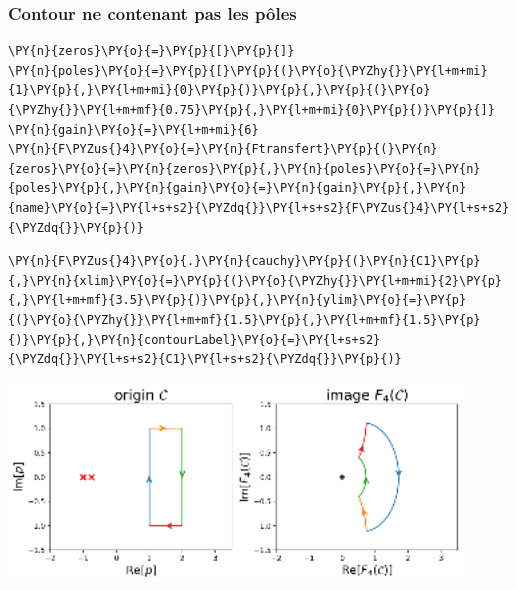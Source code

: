\subsubsection{Contour ne contenant pas les pôles}
\begin{tcolorbox}[breakable, size=fbox, boxrule=1pt, pad at break*=1mm,colback=cellbackground, colframe=cellborder]
\begin{Verbatim}[commandchars=\\\{\}]
\PY{n}{zeros}\PY{o}{=}\PY{p}{[}\PY{p}{]}
\PY{n}{poles}\PY{o}{=}\PY{p}{[}\PY{p}{(}\PY{o}{\PYZhy{}}\PY{l+m+mi}{1}\PY{p}{,}\PY{l+m+mi}{0}\PY{p}{)}\PY{p}{,}\PY{p}{(}\PY{o}{\PYZhy{}}\PY{l+m+mf}{0.75}\PY{p}{,}\PY{l+m+mi}{0}\PY{p}{)}\PY{p}{]}
\PY{n}{gain}\PY{o}{=}\PY{l+m+mi}{6}
\PY{n}{F\PYZus{}4}\PY{o}{=}\PY{n}{Ftransfert}\PY{p}{(}\PY{n}{zeros}\PY{o}{=}\PY{n}{zeros}\PY{p}{,}\PY{n}{poles}\PY{o}{=}\PY{n}{poles}\PY{p}{,}\PY{n}{gain}\PY{o}{=}\PY{n}{gain}\PY{p}{,}\PY{n}{name}\PY{o}{=}\PY{l+s+s2}{\PYZdq{}}\PY{l+s+s2}{F\PYZus{}4}\PY{l+s+s2}{\PYZdq{}}\PY{p}{)}
\end{Verbatim}
\end{tcolorbox}
\begin{tcolorbox}[breakable, size=fbox, boxrule=1pt, pad at break*=1mm,colback=cellbackground, colframe=cellborder]
\begin{Verbatim}[commandchars=\\\{\}]
\PY{n}{F\PYZus{}4}\PY{o}{.}\PY{n}{cauchy}\PY{p}{(}\PY{n}{C1}\PY{p}{,}\PY{n}{xlim}\PY{o}{=}\PY{p}{(}\PY{o}{\PYZhy{}}\PY{l+m+mi}{2}\PY{p}{,}\PY{l+m+mf}{3.5}\PY{p}{)}\PY{p}{,}\PY{n}{ylim}\PY{o}{=}\PY{p}{(}\PY{o}{\PYZhy{}}\PY{l+m+mf}{1.5}\PY{p}{,}\PY{l+m+mf}{1.5}\PY{p}{)}\PY{p}{,}\PY{n}{contourLabel}\PY{o}{=}\PY{l+s+s2}{\PYZdq{}}\PY{l+s+s2}{C1}\PY{l+s+s2}{\PYZdq{}}\PY{p}{)}
\end{Verbatim}
\end{tcolorbox}
\begin{center}
    \includegraphics[width=0.9\textwidth]{notebook/fig/output_39_1.eps}
\end{center}

